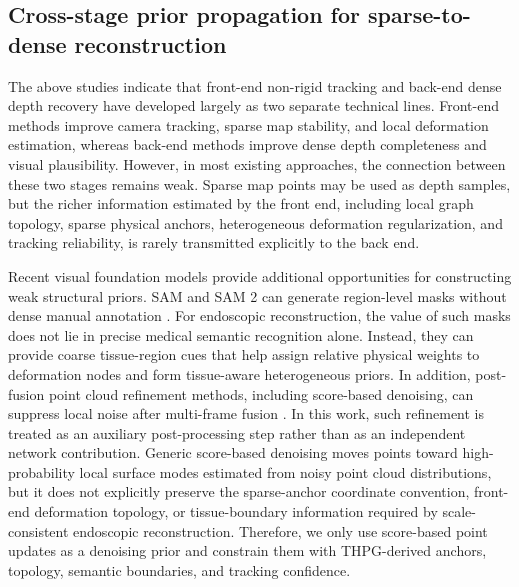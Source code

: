 \documentclass[pdflatex,sn-mathphys-num]{sn-jnl}
\begin{document}
\subsection{Cross-stage prior propagation for sparse-to-dense reconstruction}

The above studies indicate that front-end non-rigid tracking and back-end dense depth recovery have developed largely as two separate technical lines. Front-end methods improve camera tracking, sparse map stability, and local deformation estimation, whereas back-end methods improve dense depth completeness and visual plausibility. However, in most existing approaches, the connection between these two stages remains weak. Sparse map points may be used as depth samples, but the richer information estimated by the front end, including local graph topology, sparse physical anchors, heterogeneous deformation regularization, and tracking reliability, is rarely transmitted explicitly to the back end.

Recent visual foundation models provide additional opportunities for constructing weak structural priors. SAM and SAM 2 can generate region-level masks without dense manual annotation \cite{bib34,bib35}. For endoscopic reconstruction, the value of such masks does not lie in precise medical semantic recognition alone. Instead, they can provide coarse tissue-region cues that help assign relative physical weights to deformation nodes and form tissue-aware heterogeneous priors. In addition, post-fusion point cloud refinement methods, including score-based denoising, can suppress local noise after multi-frame fusion \cite{bib36,bib37}. In this work, such refinement is treated as an auxiliary post-processing step rather than as an independent network contribution. Generic score-based denoising moves points toward high-probability local surface modes estimated from noisy point cloud distributions, but it does not explicitly preserve the sparse-anchor coordinate convention, front-end deformation topology, or tissue-boundary information required by scale-consistent endoscopic reconstruction. Therefore, we only use score-based point updates as a denoising prior and constrain them with THPG-derived anchors, topology, semantic boundaries, and tracking confidence.
\end{document}
